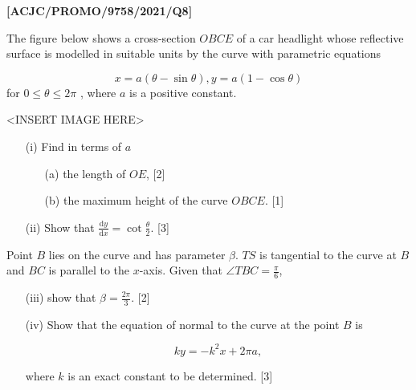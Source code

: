 \item \textbf{{[}ACJC/PROMO/9758/2021/Q8{]}}

The figure below shows a cross-section $OBCE$ of a car headlight
whose reflective surface is modelled in suitable units by the curve
with parametric equations

\[
x=a(\theta-\sin\theta),y=a(1-\cos\theta)
\]
 for $0\le\theta\le2\pi$ , where $a$ is a positive constant.
\noindent \begin{center}
<INSERT IMAGE HERE>
\par\end{center}
\begin{enumerate}
\item[(i)]  Find in terms of $a$ 
\begin{enumerate}
\item[(a)]  the length of $OE$, \hfill{} {[}2{]}
\item[(b)]  the maximum height of the curve $OBCE$. \hfill{}{[}1{]}
\end{enumerate}
\item[(ii)]  Show that $\frac{\text{d}y}{\text{d}x}=\cot\frac{\theta}{2}$. \hfill{}
{[}3{]}
\end{enumerate}
Point $B$ lies on the curve and has parameter $\beta$. $TS$ is
tangential to the curve at $B$ and $BC$ is parallel to the $x$-axis.
Given that $\angle TBC=\frac{\pi}{6}$, 
\begin{enumerate}
\item[(iii)]  show that $\beta=\frac{2\pi}{3}$. \hfill{}{[}2{]}
\item[(iv)]  Show that the equation of normal to the curve at the point $B$
is 

\[
ky=-k^{2}x+2\pi a,
\]
 

where $k$ is an exact constant to be determined. \hfill{}{[}3{]}
\end{enumerate}